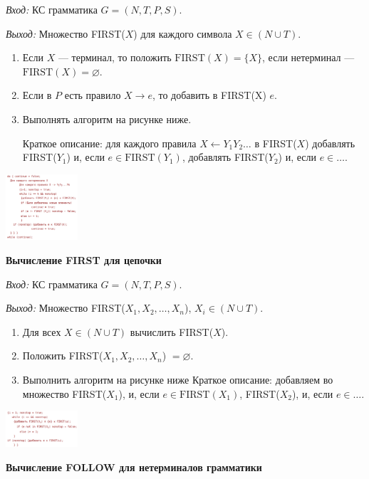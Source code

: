 \textit{Вход:} КС грамматика $G = (N, T, P, S)$.

\textit{Выход:} Множество FIRST($X$) для каждого символа $X \in (N \cup T)$.

\begin{enumerate}
    \item Если $X$ --- терминал, то положить $\text{FIRST}(X) = \{X\}$, если нетерминал --- $\text{FIRST}(X) = \varnothing$.
    \item Если в $P$ есть правило $X \rightarrow e$, то добавить в FIRST(X) $e$.
    \item Выполнять алгоритм на рисунке ниже.
    
    Краткое описание: для каждого правила $X \leftarrow Y_1 Y_2 \dots$ в FIRST($X$) добавлять FIRST($Y_1$) и, если $e \in \text{FIRST}(Y_1)$, добавлять FIRST($Y_2$) и, если $e \in \dots$. 
\end{enumerate}

\includegraphics[width=0.2\textwidth]{pics/first.png}

\textbf{Вычисление FIRST для цепочки}

\textit{Вход:} КС грамматика $G = (N, T, P, S)$.

\textit{Выход:} Множество FIRST($X_1, X_2, \dots, X_n$), $X_i \in (N \cup T)$.


\begin{enumerate}
    \item Для всех $X \in (N \cup T)$ вычислить FIRST($X$).
    \item Положить FIRST($X_1, X_2, \dots, X_n$) $ = \varnothing$.
    \item Выполнить алгоритм на рисунке ниже \newline
    Краткое описание: добавляем во множество FIRST($X_1$), и, если $e \in \text{FIRST}(X_1)$, FIRST($X_2$), и, если $e \in \dots$.
\end{enumerate}

\includegraphics[width=0.2\textwidth]{pics/firstc.png}

\textbf{Вычисление FOLLOW для нетерминалов грамматики}

